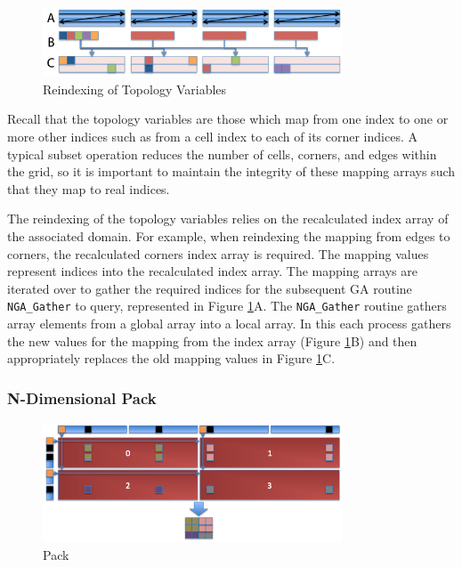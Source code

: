 \begin{figure}[!t]
\center
\includegraphics[width=3.5in]{images/reindex_label}
\caption{Reindexing of Topology Variables}
\label{fig:reindex}
\end{figure}

Recall that the topology variables are those which map from one index to
one or more other indices such as from a cell index to each of its corner
indices.  A typical subset operation reduces the number of cells, corners, and
edges within the grid, so it is important to maintain the integrity of these
mapping arrays such that they map to real indices.

The reindexing of the topology variables relies on the recalculated index
array of the associated domain.  For example, when reindexing the mapping from
edges to corners, the recalculated corners index array is required.  The
mapping values represent indices into the recalculated index array.  The
mapping arrays are iterated over to gather the required indices for the
subsequent GA routine \verb=NGA_Gather= to query, represented in Figure
\ref{fig:reindex}A.  The \verb=NGA_Gather= routine gathers array elements from
a global array into a local array.  In this each process gathers the new
values for the mapping from the index array (Figure \ref{fig:reindex}B) and
then appropriately replaces the old mapping values in Figure
\ref{fig:reindex}C.

\subsubsection{N-Dimensional Pack}
\label{section:alg_pack}

\begin{figure}[!t]
\center
\includegraphics[width=3.5in]{images/pack}
\caption{Pack}
\label{fig:pack}
\end{figure}


